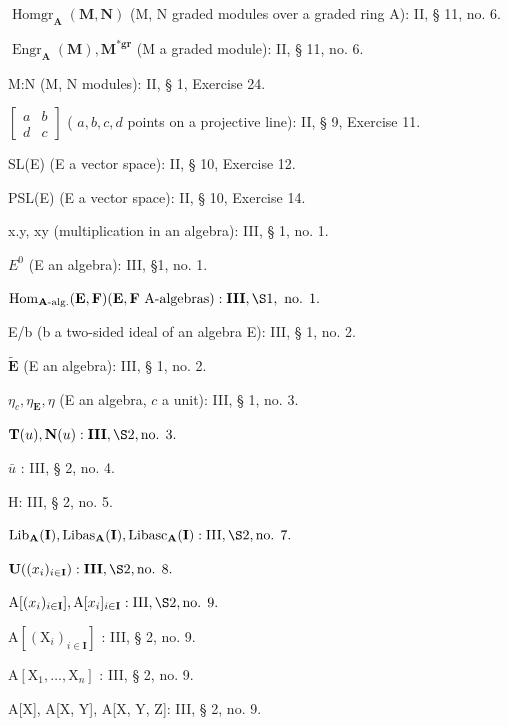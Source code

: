 \(\operatorname{Homgr}_{\mathbf{A}}(\mathbf{M}, \mathbf{N})\) (M, N graded modules over a graded ring A): II, § 11, no. 6.

\(\operatorname{Engr}_{\mathbf{A}}(\mathbf{M}), \mathbf{M}^{*\mathbf{g}\mathbf{r}}\) (M a graded module): II, § 11, no. 6.

M:N (M, N modules): II, § 1, Exercise 24.

\(\begin{bmatrix} a & b \\ d & c \end{bmatrix}\) ( \(a, b, c, d\) points on a projective line): II, § 9, Exercise 11.

SL(E) (E a vector space): II, § 10, Exercise 12.

PSL(E) (E a vector space): II, § 10, Exercise 14.

x.y, xy (multiplication in an algebra): III, § 1, no. 1.

\(E^{0}\) (E an algebra): III, §1, no. 1.

\(\operatorname{Hom}_{\mathbf{A}\text{-alg.}}(\mathbf{E}, \mathbf{F}) (\mathbf{E}, \mathbf{F} \text{ A-algebras}): \mathbf{III}, \S 1, \text{ no. } 1.\)

E/b (b a two-sided ideal of an algebra E): III, § 1, no. 2.

\(\tilde{\mathbf{E}}\) (E an algebra): III, § 1, no. 2.

\(\eta_{c}, \eta_{\mathbf{E}}, \eta\) (E an algebra, \(c\) a unit): III, § 1, no. 3.

\(\mathbf{T}(u), \mathbf{N}(u): \mathbf{III}, \S 2, \text{no. } 3.\)

\(\bar{u}\) : III, § 2, no. 4.

H: III, § 2, no. 5.

\(\operatorname{Lib}_{\mathbf{A}}(\mathbf{I}), \operatorname{Libas}_{\mathbf{A}}(\mathbf{I}), \operatorname{Libasc}_{\mathbf{A}}(\mathbf{I}) : \operatorname{III}, \S 2, \text{no. } 7.\)

\(\mathbf{U}((x_i)_{i \in \mathbf{I}}): \mathbf{III}, \S 2, \text{no. } 8.\)

\(\mathrm{A}[(x_i)_{i \in \mathbf{I}}], \mathrm{A}[x_i]_{i \in \mathbf{I}}: \mathrm{III}, \S 2, \text{no. } 9.\)

\(\mathrm{A}[(\mathrm{X}_i)_{i\in \mathbf{I}}]\) : III, § 2, no. 9.

\(\mathrm{A}[\mathrm{X}_1,\dots ,\mathrm{X}_n]\) : III, § 2, no. 9.

A{[}X{]}, A{[}X, Y{]}, A{[}X, Y, Z{]}: III, § 2, no. 9.

